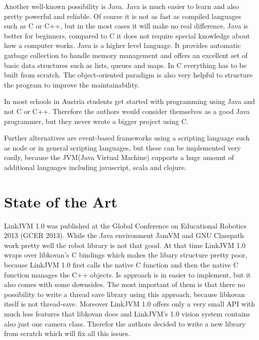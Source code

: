 \documentclass{juniorjournal}
\begin{document}
Another well-known possibility is Java\cite{Java}. 
Java\cite{Java} is much easier to learn and also pretty powerful and reliable.
Of course it is not as fast as compiled languages such as C or C++, 
but in the most cases it will make no real difference.
Java\cite{Java} is better for beginners, 
compared to C it does not require special knowledge about how a computer works.
Java\cite{Java} is a higher level language.
It provides automatic garbage collection to handle memory management 
and offers an excellent set of basic data structures such as lists, queues and maps.
In C everything has to be built from scratch.
The object-oriented paradigm is also very helpful to structure the program 
to improve the maintainability.

In most schools in Austria students get started with programming using Java\cite{Java} and not C or C++.
Therefore the authors would consider themselves as a good Java\cite{Java} programmer, 
but they never wrote a bigger project using C.

Further alternatives are event-based frameworks using a scripting language 
such as node\cite{node} or in general scripting languages, but these can be implemented very easily, 
because the JVM\cite{JVM}(Java\cite{Java} Virtual Machine) supports a huge amount of additional languages 
including javascript, scala and clojure.

\section{State of the Art}
LinkJVM 1.0\cite{linkjvm1.0} was published at the Global Conference on Educational Robotics 2013 (GCER\cite{GCER} 2013).
While the Java\cite{Java} environment JamVM and GNU Classpath\cite{GNU} work pretty well the robot library is not that good.
At that time LinkJVM 1.0\cite{linkjvm1.0} wraps over libkovan's\cite{libkovan} C bindings which makes the libary structure pretty poor, because LinkJVM 1.0\cite{linkjvm1.0} first calls the native C function and then the native C function manages the C++ objects.
Is approach is in easier to implement, but it also comes with some downsides.
The most important of them is that there no possibility to write a thread save library using this approach, because libkovan\cite{libkovan} itself is not thread-save.
Moreover LinkJVM 1.0\cite{linkjvm1.0} offers only a very small API with much less features that libkovan\cite{libkovan} does and LinkJVM's 1.0\cite{linkjvm1.0} vision system contains also just one camera class.
Therefor the authors decided to write a new library from scratch which will fix all this issues. 
\end{document}
